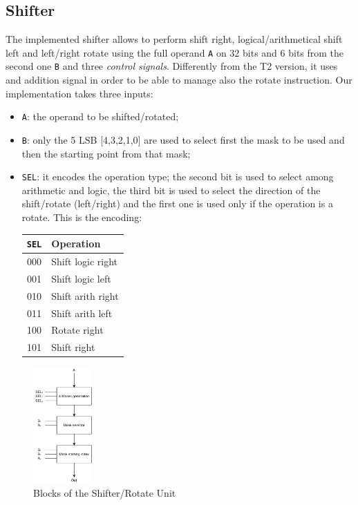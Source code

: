 \subsection{Shifter}
The implemented shifter allows to perform shift right, logical/arithmetical shift left and left/right rotate using the full operand \texttt{A} on 32 bits and 6 bits from the second one \texttt{B} and three \textit{control signals}.
Differently from the T2 version, it uses and addition signal in order to be able to manage also the rotate instruction. Our implementation takes three inputs:
\begin{itemize}
    \itemsep0sp
    \item \texttt{A}: the operand to be shifted/rotated;
    \item \texttt{B}: only the 5 LSB [4,3,2,1,0] are used to select first the mask to be used and then the starting point from that mask;
    \item \texttt{SEL}: it encodes the operation type; the second bit is used to select among arithmetic and logic, the third bit is used to select the direction of the shift/rotate (left/right) and the first one is used only if the operation is a rotate. This is the encoding:
    \begin{center}
        \begin{tabular}{c|l}
            \texttt{SEL} & \textbf{Operation}\\
            \hline
            000 & Shift logic right \\
            001 & Shift logic left \\
            010 & Shift arith right \\
            011 & Shift arith left \\
            100 & Rotate right \\
            101 & Shift right \\
        \end{tabular}
    \end{center}
\end{itemize}

\begin{figure}[ht]
    \centering
    \includegraphics[width=0.2\textwidth]{chapters/5_ExecuteStage/images/Shifter.pdf}
    \caption{Blocks of the Shifter/Rotate Unit}
    \label{fig:shifter}
\end{figure}

